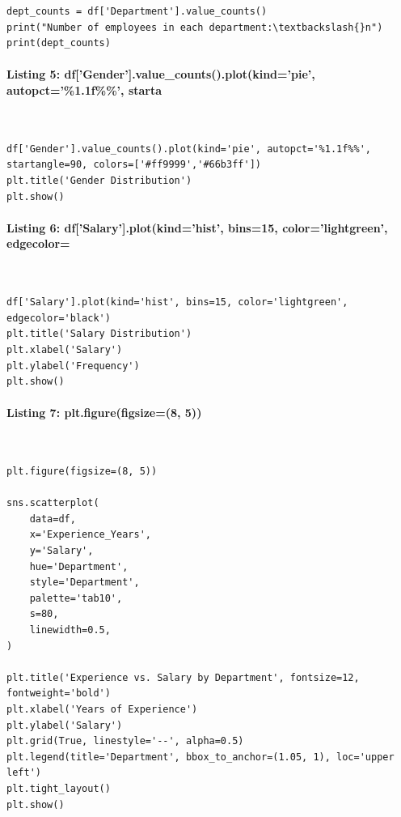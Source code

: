 \documentclass[12pt,a4paper,oneside]{report}
\begin{document}
\begin{Verbatim}[commandchars=\\\{\},breaklines=true,breakanywhere=true,fontsize=\scriptsize,frame=leftline,framesep=2mm,rulecolor=\color{gray}]
dept_counts = df['Department'].value_counts()
print("Number of employees in each department:\textbackslash{}n")
print(dept_counts)
\end{Verbatim}
\paragraph{Listing 5: df['Gender'].value\_counts().plot(kind='pie', autopct='\%1.1f\%\%', starta}\mbox{}\\[-1ex]
\begin{Verbatim}[commandchars=\\\{\},breaklines=true,breakanywhere=true,fontsize=\scriptsize,frame=leftline,framesep=2mm,rulecolor=\color{gray}]
df['Gender'].value_counts().plot(kind='pie', autopct='%1.1f%%', startangle=90, colors=['#ff9999','#66b3ff'])
plt.title('Gender Distribution')
plt.show()
\end{Verbatim}
\paragraph{Listing 6: df['Salary'].plot(kind='hist', bins=15, color='lightgreen', edgecolor=}\mbox{}\\[-1ex]
\begin{Verbatim}[commandchars=\\\{\},breaklines=true,breakanywhere=true,fontsize=\scriptsize,frame=leftline,framesep=2mm,rulecolor=\color{gray}]
df['Salary'].plot(kind='hist', bins=15, color='lightgreen', edgecolor='black')
plt.title('Salary Distribution')
plt.xlabel('Salary')
plt.ylabel('Frequency')
plt.show()
\end{Verbatim}
\paragraph{Listing 7: plt.figure(figsize=(8, 5))}\mbox{}\\[-1ex]
\begin{Verbatim}[commandchars=\\\{\},breaklines=true,breakanywhere=true,fontsize=\scriptsize,frame=leftline,framesep=2mm,rulecolor=\color{gray}]
plt.figure(figsize=(8, 5))

sns.scatterplot(
    data=df,
    x='Experience_Years',
    y='Salary',
    hue='Department',
    style='Department',
    palette='tab10',
    s=80,
    linewidth=0.5,
)

plt.title('Experience vs. Salary by Department', fontsize=12, fontweight='bold')
plt.xlabel('Years of Experience')
plt.ylabel('Salary')
plt.grid(True, linestyle='--', alpha=0.5)
plt.legend(title='Department', bbox_to_anchor=(1.05, 1), loc='upper left')
plt.tight_layout()
plt.show()
\end{Verbatim}
\end{document}
